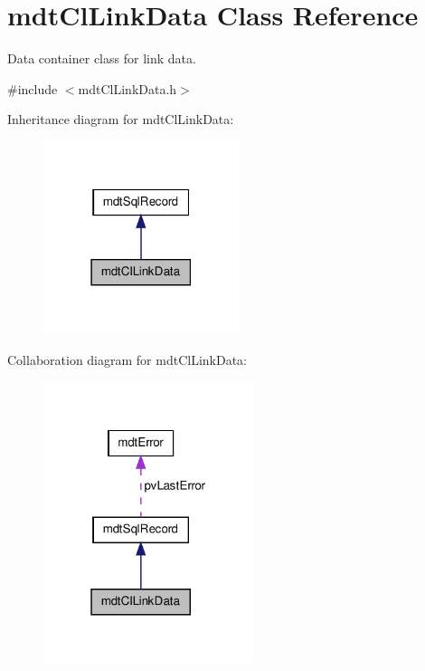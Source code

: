 \hypertarget{classmdt_cl_link_data}{\section{mdt\-Cl\-Link\-Data Class Reference}
\label{classmdt_cl_link_data}
}


Data container class for link data.  




{\ttfamily \#include $<$mdt\-Cl\-Link\-Data.\-h$>$}



Inheritance diagram for mdt\-Cl\-Link\-Data\-:\nopagebreak
\begin{figure}[H]
\begin{center}
\leavevmode
\includegraphics[width=162pt]{classmdt_cl_link_data__inherit__graph}
\end{center}
\end{figure}


Collaboration diagram for mdt\-Cl\-Link\-Data\-:\nopagebreak
\begin{figure}[H]
\begin{center}
\leavevmode
\includegraphics[width=175pt]{classmdt_cl_link_data__coll__graph}
\end{center}
\end{figure}
